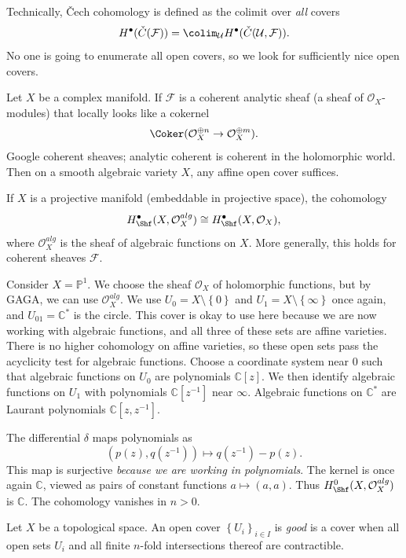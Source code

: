 Technically, \v{C}ech cohomology is defined as the colimit over \emph{all} covers
\[
	H^{\bullet} (\check{C} (\mathcal{F} ))=\colim_{\mathcal{U} } H^{\bullet} (\check{C}(\mathcal{U} ,\mathcal{F} ))
.\]
No one is going to enumerate all open covers, so we look for sufficiently nice open covers.
\begin{theorem}[Serre]\label{thm:owo}
	Let $X$ be a complex manifold. If $\mathcal{F} $ is a coherent analytic sheaf (a sheaf of $\mathcal{O} _X$-modules) that locally looks like a cokernel
	\[
		\Coker(\mathcal{O} _X^{\oplus n} \to \mathcal{O} _X^{\oplus m} )
	.\]
	Google coherent sheaves; analytic coherent is coherent in the holomorphic world. Then on a smooth algebraic variety $X$, any affine open cover suffices.
\end{theorem}
\begin{theorem}[GAGA]\label{thm:owo2}
	If $X$ is a projective manifold (embeddable in projective space), the cohomology
	\[
		H^{\bullet}_{\Shf }(X,\mathcal{O} _X^{alg}) \cong H^{\bullet}_{\Shf } (X, \mathcal{O} _X)
	,\]
	where $\mathcal{O} _X^{alg} $ is the sheaf of algebraic functions on $X$. More generally, this holds for coherent sheaves $\mathcal{F} $.
\end{theorem}

\begin{example}
	Consider $X=\mathbb{P} ^1$. We choose the sheaf $\mathcal{O} _X$ of holomorphic functions, but by GAGA,  we can use $\mathcal{O} _X^{alg} $. We use $U_0 = X\setminus \left\{ 0 \right\} $ and $U_1=X\setminus \left\{ \infty  \right\} $ once again, and $U_{01} =\mathbb{C} ^*$ is the circle. This cover is okay to use here because we are now working with algebraic functions, and all three of these sets are affine varieties. There is no higher cohomology on affine varieties, so these open sets pass the acyclicity test for algebraic functions. Choose a coordinate system near $0$ such that algebraic functions on $U_0$ are polynomials $\mathbb{C} [z]$. We then identify algebraic functions on $U_1$ with polynomials $\mathbb{C} [z^{-1} ]$ near $\infty $. Algebraic functions on $\mathbb{C} ^*$ are Laurant polynomials $\mathbb{C} [z, z^{-1} ]$.

	The differential $\delta $ maps polynomials as
	\[
		(p(z), q(z^{-1} ))\mapsto q(z^{-1} ) - p(z)
	.\]
	This map is surjective \emph{because we are working in polynomials}. The kernel is once again $\mathbb{C} $, viewed as pairs of constant functions $a \mapsto (a,a)$. Thus $H^0_{\Shf } (X,\mathcal{O} _X^{alg} )$ is $\mathbb{C} $. The cohomology vanishes in $n>0$.
\end{example}




\begin{definition}\label{4.2.2}
	Let $X$ be a topological space. An open cover $\left\{ U_i \right\} _{i\in I} $ is \emph{good} is a cover when all open sets $U_i$ and all finite $n$-fold intersections thereof are contractible.
\end{definition}
